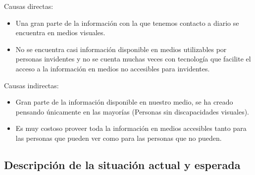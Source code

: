 \documentclass[a4paper, 12pt, oneside]{article}
\begin{document}
	Causas directas:
	\begin{itemize}
	\item Una gran parte de la información con la que tenemos contacto a diario se encuentra en medios visuales.
	\item No se encuentra casi información disponible en medios utilizables por personas invidentes y no se cuenta muchas veces con tecnología que facilite el acceso a la información en medios no accesibles para invidentes.
	\end{itemize}

	Causas indirectas:
	\begin{itemize}
	\item Gran parte de la información disponible en nuestro medio, se ha creado pensando únicamente en las mayorías (Personas sin discapacidades visuales).
	\item Es muy costoso proveer toda la información en medios accesibles tanto para las personas que pueden ver como para las personas que no pueden.
	\end{itemize}



	\begin{center}
	\section{Descripción de la situación actual y esperada}
	\end{center}
\end{document}
